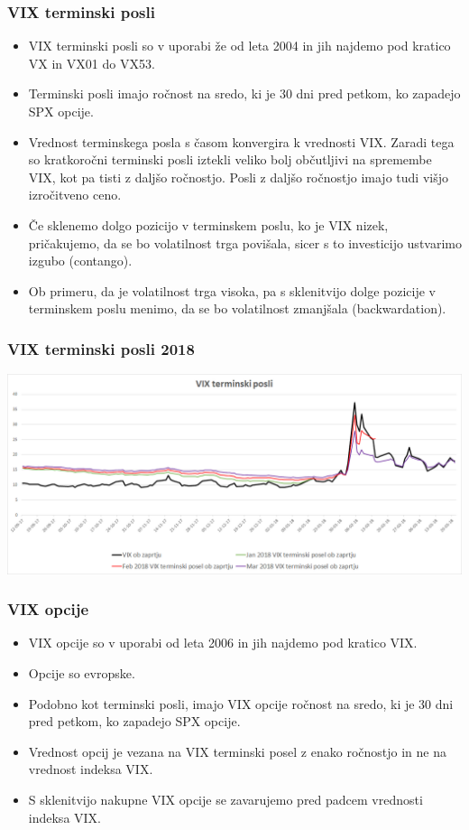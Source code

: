 \documentclass[10pt]{beamer}
\begin{document}
\begin{frame}
\frametitle{VIX terminski posli}
\begin{itemize}
\item VIX terminski posli so v uporabi že od leta 2004 in jih najdemo pod kratico VX in VX01 do VX53.
\item Terminski posli imajo ročnost na sredo, ki je 30 dni pred petkom, ko zapadejo SPX opcije.
\item Vrednost terminskega posla s časom konvergira k vrednosti VIX. Zaradi tega so kratkoročni terminski posli iztekli veliko bolj občutljivi na spremembe VIX, kot pa tisti z daljšo ročnostjo. Posli z daljšo ročnostjo imajo tudi višjo izročitveno ceno.
\item Če sklenemo dolgo pozicijo v terminskem poslu, ko je VIX nizek, pričakujemo, da se bo volatilnost trga povišala, sicer s to investicijo ustvarimo izgubo (contango). 
\item Ob primeru, da je volatilnost trga visoka, pa s sklenitvijo dolge pozicije v terminskem poslu menimo, da se bo volatilnost zmanjšala (backwardation). 
\end{itemize}
\end{frame}

\begin{frame}
\frametitle{VIX terminski posli 2018}
\includegraphics[width=1\textwidth]{./Grafi/VIX futures 2018.png}
\end{frame}

\begin{frame}
\frametitle{VIX opcije}
\begin{itemize}
\item VIX opcije so v uporabi od leta 2006 in jih najdemo pod kratico VIX.
\item Opcije so evropske.
\item Podobno kot terminski posli, imajo VIX opcije ročnost na sredo, ki je 30 dni pred petkom, ko zapadejo SPX opcije.
\item Vrednost opcij je vezana na VIX terminski posel z enako ročnostjo in ne na vrednost indeksa VIX.
\item S sklenitvijo nakupne VIX opcije se zavarujemo pred padcem vrednosti indeksa VIX.
\end{itemize}
\end{frame}
\end{document}
